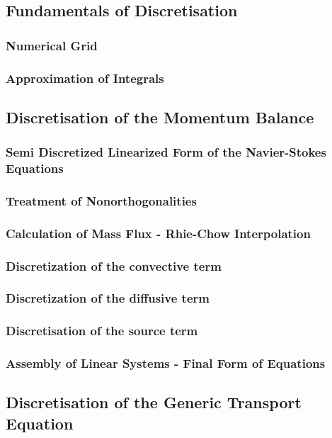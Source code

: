 \documentclass[article,type=msc,colorback,accentcolor=tud2a]{tudthesis}
\begin{document}
    \subsection{Fundamentals of Discretisation}
      
      \subsubsection{Numerical Grid}
      \subsubsection{Approximation of Integrals}

    \subsection{Discretisation of the Momentum Balance}
      
      \subsubsection{Semi Discretized Linearized Form of the Navier-Stokes Equations}
      \subsubsection{Treatment of Nonorthogonalities}
      \subsubsection{Calculation of Mass Flux - Rhie-Chow Interpolation}
      \subsubsection{Discretization of the convective term}
      \subsubsection{Discretization of the diffusive term}
      \subsubsection{Discretisation of the source term}
      \subsubsection{Assembly of Linear Systems - Final Form of Equations}

    \subsection{Discretisation of the Generic Transport Equation}
\end{document}
